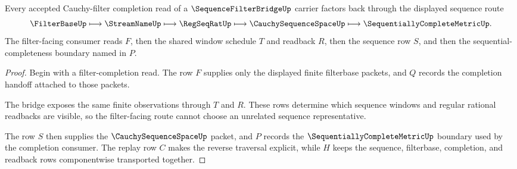 \begin{theorem}\label{thm:sequence-filter-bridge-filter-to-sequence-route}
Every accepted Cauchy-filter completion read of a $\SequenceFilterBridgeUp$ carrier factors back through the displayed sequence route
$$
\FilterBaseUp \longmapsto \StreamNameUp \longmapsto \RegSeqRatUp \longmapsto \CauchySequenceSpaceUp \longmapsto \SequentiallyCompleteMetricUp .
$$
The filter-facing consumer reads $F$, then the shared window schedule $T$ and readback $R$, then the sequence row $S$, and then the sequential-completeness boundary named in $P$.
\end{theorem}
\begin{proof}
Begin with a filter-completion read. The row $F$ supplies only the displayed finite filterbase packets, and $Q$ records the completion handoff attached to those packets.

The bridge exposes the same finite observations through $T$ and $R$. These rows determine which sequence windows and regular rational readbacks are visible, so the filter-facing route cannot choose an unrelated sequence representative.

The row $S$ then supplies the $\CauchySequenceSpaceUp$ packet, and $P$ records the $\SequentiallyCompleteMetricUp$ boundary used by the completion consumer. The replay row $C$ makes the reverse traversal explicit, while $H$ keeps the sequence, filterbase, completion, and readback rows componentwise transported together.
\end{proof}


